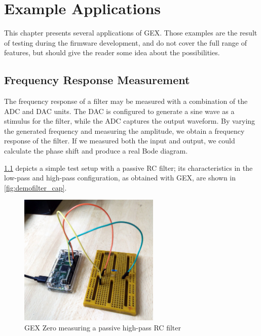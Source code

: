\chapter{Example Applications}

This chapter presents several applications of GEX. Those examples are the result of testing during the firmware development, and do not cover the full range of features, but should give the reader some idea about the possibilities.

\section{Frequency Response Measurement}

The frequency response of a filter may be measured with a combination of the \gls{ADC} and \gls{DAC} units. The \gls{DAC} is configured to generate a sine wave as a stimulus for the filter, while the \gls{ADC} captures the output waveform. By varying the generated frequency and measuring the amplitude, we obtain a frequency response of the filter. If we measured both the input and output, we could calculate the phase shift and produce a real Bode diagram.

\cref{fig:demofilter} depicts a simple test setup with a passive RC filter; its characteristics in the low-pass and high-pass configuration, as obtained with GEX, are shown in \cref{fig:demofilter_cap}.

\begin{figure}[h]
	\centering
	\includegraphics[width=0.6\textwidth]{img/demofilter.jpg}
	\caption{GEX Zero measuring a passive high-pass RC filter}
	\label{fig:demofilter}
\end{figure}

